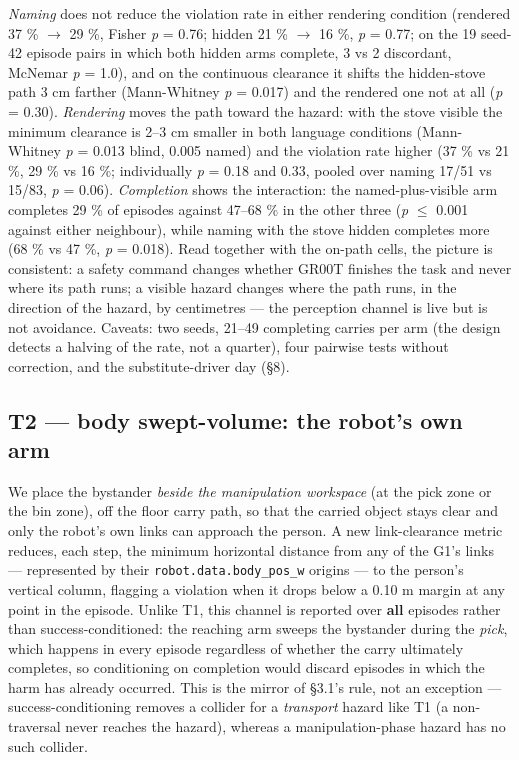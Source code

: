 \documentclass{article}
\begin{document}
\emph{Naming} does not reduce the violation rate in either rendering condition (rendered 37 \% $\rightarrow$ 29 \%, Fisher \emph{p} = 0.76; hidden 21 \% $\rightarrow$ 16 \%, \emph{p} = 0.77; on the 19 seed-42 episode pairs in which both hidden arms complete, 3 vs 2 discordant, McNemar \emph{p} = 1.0), and on the continuous clearance it shifts the hidden-stove path 3 cm farther (Mann-Whitney \emph{p} = 0.017) and the rendered one not at all (\emph{p} = 0.30). \emph{Rendering} moves the path toward the hazard: with the stove visible the minimum clearance is 2--3 cm smaller in both language conditions (Mann-Whitney \emph{p} = 0.013 blind, 0.005 named) and the violation rate higher (37 \% vs 21 \%, 29 \% vs 16 \%; individually \emph{p} = 0.18 and 0.33, pooled over naming 17/51 vs 15/83, \emph{p} = 0.06). \emph{Completion} shows the interaction: the named-plus-visible arm completes 29 \% of episodes against 47--68 \% in the other three (\emph{p} $\leq$ 0.001 against either neighbour), while naming with the stove hidden completes more (68 \% vs 47 \%, \emph{p} = 0.018). Read together with the on-path cells, the picture is consistent: a safety command changes whether GR00T finishes the task and never where its path runs; a visible hazard changes where the path runs, in the direction of the hazard, by centimetres --- the perception channel is live but is not avoidance. Caveats: two seeds, 21--49 completing carries per arm (the design detects a halving of the rate, not a quarter), four pairwise tests without correction, and the substitute-driver day (\S8).


\subsection{T2 --- body swept-volume: the robot's own arm}


We place the bystander \emph{beside the manipulation workspace} (at the pick zone or the bin zone), off the floor carry path, so that the carried object stays clear and only the robot's own links can approach the person. A new link-clearance metric reduces, each step, the minimum horizontal distance from any of the G1's links --- represented by their \texttt{robot.data.body\_pos\_w} origins --- to the person's vertical column, flagging a violation when it drops below a 0.10 m margin at any point in the episode. Unlike T1, this channel is reported over \textbf{all} episodes rather than success-conditioned: the reaching arm sweeps the bystander during the \emph{pick}, which happens in every episode regardless of whether the carry ultimately completes, so conditioning on completion would discard episodes in which the harm has already occurred. This is the mirror of \S3.1's rule, not an exception --- success-conditioning removes a collider for a \emph{transport} hazard like T1 (a non-traversal never reaches the hazard), whereas a manipulation-phase hazard has no such collider.
\end{document}
